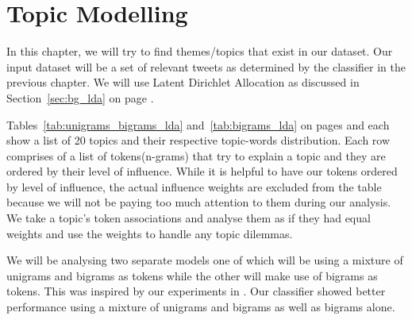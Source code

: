 \chapter{Topic Modelling}
\label{cha:topic_modelling}
In this chapter, we will try to find themes/topics that exist in our dataset. Our input dataset will
be a set of relevant tweets as determined by the classifier in the previous chapter. We will use
Latent Dirichlet Allocation as discussed in Section~\ref{sec:bg_lda} on page \pageref{sec:bg_lda}.

Tables~\ref{tab:unigrams_bigrams_lda} and~\ref{tab:bigrams_lda} on pages
\pageref{tab:unigrams_bigrams_lda} and \pageref{tab:bigrams_lda} each show a list of 20 topics and
their respective topic-words distribution. Each row comprises of a list of tokens(n-grams) that try
to explain a topic and they are ordered by their level of influence. While it is helpful to have our
tokens ordered by level of influence, the actual influence weights are excluded from the table
because we will not be paying too much attention to them during our analysis. We take a topic's
token associations and analyse them as if they had equal weights and use the weights to handle any
topic dilemmas.

We will be analysing two separate models one of which will be using a mixture of unigrams and
bigrams as tokens while the other will make use of bigrams as tokens. This was inspired by our
experiments in . Our classifier showed better performance using
a mixture of unigrams and bigrams as well as bigrams alone.

